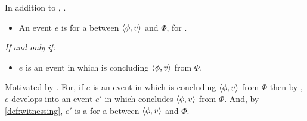 \begin{note}
  In addition to \wit{}, \pwit{}.

  \begin{definition}
    \label{def:Pwit}%
    \vspace{-\baselineskip}
    \begin{itemize}
    \item
      An event \(e\) is \emph{} for a \ros{} between \(\langle \phi, v \rangle\) and \(\Phi\), for \vAgent{}.
    \end{itemize}

    \emph{If and only if:}

    \begin{itemize}
    \item
      \(e\) is an event in which \vAgent{} is concluding \(\langle \phi, v \rangle\) from \(\Phi\).
    \end{itemize}
    \vspace{-\baselineskip}
  \end{definition}

  \noindent%
  Motivated by \assuPP{}.
  For, if \(e\) is an event in which \vAgent{} is concluding \(\langle \phi, v \rangle\) from \(\Phi\) then by \assuPP{}, \(e\) develops into an event \(e'\) in which \vAgent{} concludes \(\langle \phi, v \rangle\) from \(\Phi\).
  And, by \autoref{def:witnessing}, \(e'\) is a \wit{} for a \ros{} between \(\langle \phi, v \rangle\) and \(\Phi\).
\end{note}

\newpage

\section{\supportII{}}
\label{cha:ros:II}

